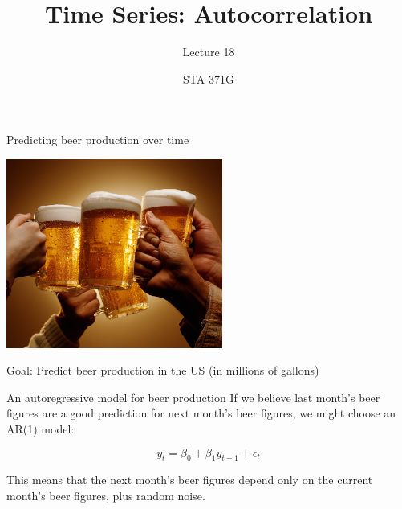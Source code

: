 \documentclass{beamer}\usepackage[]{graphicx}\usepackage[]{color}
\title{Time Series: Autocorrelation}
\subtitle{Lecture 18}
\author{STA 371G}
\begin{document}
  
  

  \frame{\maketitle}



  \begin{darkframes}
    

    \begin{frame}{Predicting beer production over time}
    \begin{center}
        \includegraphics[width=2.8in]{beer} \\
      \end{center} 
      Goal: Predict beer production in the US (in millions of gallons)
      \lc
      \end{frame} 
\begin{frame}[fragile]{An autoregressive model for beer production}
    If we believe last month's beer figures are a good prediction for next month's beer figures, we might choose an AR(1) model:
    
    $$y_t = \beta_0 + \beta_1 y_{t-1} + \epsilon_t$$
    
    This means that the next month's beer figures depend only on the current month's beer figures, plus random noise.
    
   \bigskip
   

\end{frame}
\end{darkframes}
\end{document}

